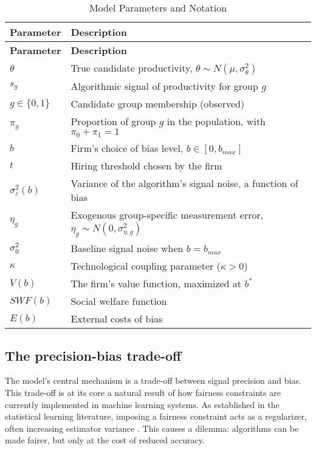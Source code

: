 \begin{longtable}{@{}ll@{}}
\caption{Model Parameters and Notation}
\label{tab:params}\\
\toprule
\textbf{Parameter} & \textbf{Description} \\ \midrule
\endfirsthead
\toprule
\textbf{Parameter} & \textbf{Description} \\ \midrule
\endhead
\bottomrule
\endfoot
$\theta$ & True candidate productivity, $\theta \sim N(\mu, \sigma_\theta^2)$ \\
$s_g$ & Algorithmic signal of productivity for group $g$ \\
$g \in \{0,1\}$ & Candidate group membership (observed) \\
$\pi_g$ & Proportion of group $g$ in the population, with $\pi_0+\pi_1=1$ \\
$b$ & Firm's choice of bias level, $b \in [0, b_{max}]$ \\
$t$ & Hiring threshold chosen by the firm \\
$\sigma_\varepsilon^2(b)$ & Variance of the algorithm's signal noise, a function of bias \\
$\eta_g$ & Exogenous group-specific measurement error, $\eta_g \sim N(0, \sigma_{\eta,g}^2)$ \\
$\sigma_0^2$ & Baseline signal noise when $b=b_{max}$ \\
$\kappa$ & Technological coupling parameter ($\kappa>0$) \\
$V(b)$ & The firm's value function, maximized at $b^*$ \\
$SWF(b)$ & Social welfare function \\
$E(b)$ & External costs of bias \\
\end{longtable}


\subsection{The precision-bias trade-off}
The model's central mechanism is a trade-off between signal precision and bias. This trade-off is at its core a natural result of how fairness constraints are currently implemented in machine learning systems. As established in the statistical learning literature, imposing a fairness constraint acts as a regularizer, often increasing estimator variance \citep{Kamishima2012, Wick2019}. This causes a dilemma: algorithms can be made fairer, but only at the cost of reduced accuracy.

